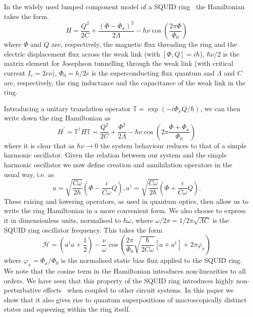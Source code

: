 \documentclass[12pt,a4paper,superscriptaddress,showpacs,floatfix,pra]{revtex4-2}
\begin{document}
In   the   widely   used   lumped   component   model   of   a   SQUID
ring~\cite{Spi1992,SrivastavaW87} the Hamiltonian takes the form.
\begin{equation}
H=\frac{Q^{2}}{2C}+\frac{\left( \Phi  -\Phi _{x}\right) ^{2}}{2\Lambda
}-\hbar   \nu  \cos   \left(  \frac{2\pi   \Phi   }{\Phi  _{0}}\right)
\label{HamSQUID}
\end{equation}
where $\Phi $  and $Q$ are, respectively, the  magnetic flux threading
the ring and the electric displacement flux across the weak link (with
$\left[  \Phi ,Q\right]  =i\hbar  $),  $\hbar \nu  /2$  is the  matrix
element for Josephson tunnelling  through the weak link (with critical
current $I_{c}=2e\nu $), $\Phi  _{0}=h/2e$ is the superconducting flux
quantum and $\Lambda $ and  $C$ are, respectively, the ring inductance
and the capacitance of the weak link in the ring.

Introducing  a unitary  translation  operator $\mathbb{T}=\exp  \left(
-i\Phi  _{x}Q/\hbar  \right)  $,  we  can then  write  down  the  ring
Hamiltonian as
\begin{equation}
H^{\prime }={\mathbb{T}}^{\dagger }H{\mathbb{T}}=\frac{Q^{2}}{2C}+\frac{\Phi
^{2}}{2\Lambda }-\hbar \nu \cos \left( 2\pi \frac{\Phi +\Phi _{x}}{\Phi _{0}}\right)  \label{eq:HamST}
\end{equation}
where  it  is clear  that  as $\hbar  \nu  \rightarrow  0$ the  system
behaviour reduces to  that of a simple harmonic  oscillator. Given the
relation between our system and  the simple harmonic oscillator we now
define creation and annihilation operators in the usual way, i.e. as
\begin{equation*}
a=\sqrt{\frac{C\omega }{2\hbar }}\left( \Phi -\frac{i}{C\omega }Q\right)
,a^{\dagger }=\sqrt{\frac{C\omega }{2\hbar }}\left( \Phi +\frac{i}{C\omega }
Q\right) .
\end{equation*}
These raising and lowering operators,  as used in quantum optics, then
allow us to  write the ring Hamiltonian in a  more convenient form. We
also choose to express it in dimensionless units, normalised to $\hbar
\omega $, where  $\omega /2\pi =1/2\pi \sqrt{\Lambda C}$  is the SQUID
ring oscillator frequency. This takes the form
\begin{equation}
\mathcal{H}=\left( a^{\dagger }a+\frac{1}{2}\right) -\frac{\nu }{\omega }\cos \left( \frac{2\pi }{\Phi _{0}}\sqrt{\frac{\hbar }{2C\omega }}\left[
a+a^{\dagger }\right] +2\pi \varphi _{x}\right)  \label{HamNorm}
\end{equation}
where $\varphi _{x}=\Phi _{x}/\Phi _{0}$ is the normalised static bias
flux applied  to the SQUID ring. We  note that the cosine  term in the
Hamiltonian  introduces non-linearities  to all  orders. We  have seen
that   this   property   of   the   SQUID   ring   introduces   highly
non-perturbative  effects~\cite{EverittSCVRPP01,EverittCSPPVR01}  when
coupled to other  circuit systems. In this paper we  show that it also
gives  rise  to  quantum  superpositions of  macroscopically  distinct
states and squeezing within the ring itself.
\end{document}
